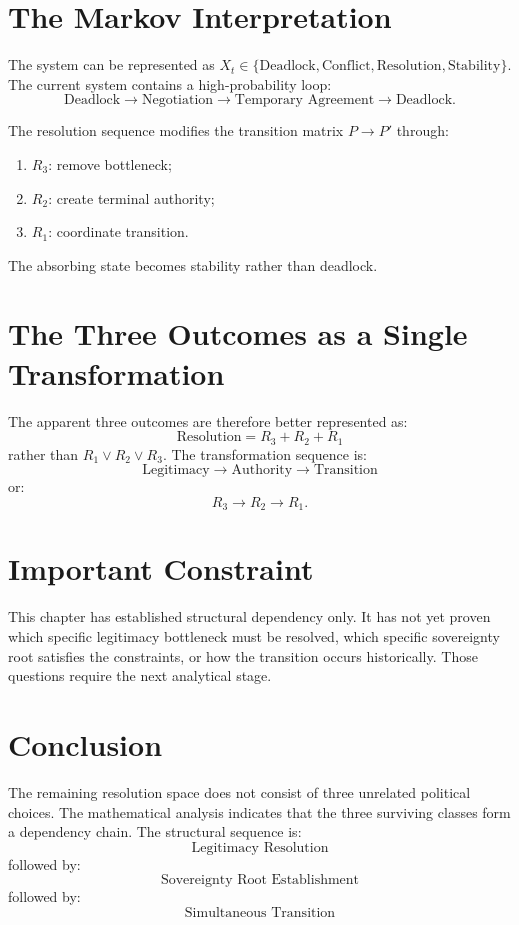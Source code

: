 \documentclass[11pt,openany]{book}
\theoremstyle{plain}
\theoremstyle{definition}
\begin{document}
\section*{The Markov Interpretation}

The system can be represented as \(X_t \in \{\text{Deadlock}, \text{Conflict}, \text{Resolution}, \text{Stability}\}\). The current system contains a high-probability loop:
\[
\text{Deadlock} \longrightarrow \text{Negotiation} \longrightarrow \text{Temporary Agreement} \longrightarrow \text{Deadlock}.
\]

The resolution sequence modifies the transition matrix \(P \to P'\) through:
\begin{enumerate}
\item \(R_3\): remove bottleneck;
\item \(R_2\): create terminal authority;
\item \(R_1\): coordinate transition.
\end{enumerate}

The absorbing state becomes stability rather than deadlock.

\section*{The Three Outcomes as a Single Transformation}

The apparent three outcomes are therefore better represented as:
\[
\boxed{
\text{Resolution} = R_3 + R_2 + R_1
}
\]
rather than \(R_1 \lor R_2 \lor R_3\). The transformation sequence is:
\[
\boxed{
\text{Legitimacy} \longrightarrow \text{Authority} \longrightarrow \text{Transition}
}
\]
or:
\[
\boxed{
R_3 \longrightarrow R_2 \longrightarrow R_1.
}
\]

\section*{Important Constraint}

This chapter has established structural dependency only. It has not yet proven which specific legitimacy bottleneck must be resolved, which specific sovereignty root satisfies the constraints, or how the transition occurs historically. Those questions require the next analytical stage.

\section*{Conclusion}

The remaining resolution space does not consist of three unrelated political choices. The mathematical analysis indicates that the three surviving classes form a dependency chain. The structural sequence is:
\[
\boxed{
\text{Legitimacy Resolution}
}
\]
followed by:
\[
\boxed{
\text{Sovereignty Root Establishment}
}
\]
followed by:
\[
\boxed{
\text{Simultaneous Transition}
}
\]
\end{document}

